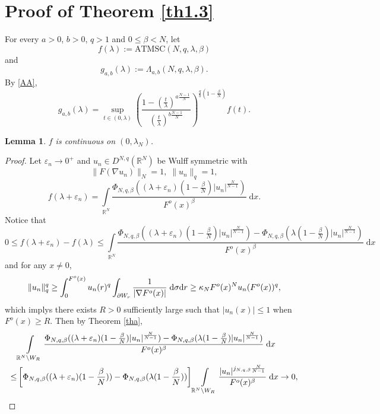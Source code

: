 \documentclass[11pt]{article}
\theoremstyle{plain}
\newtheorem{lemma}[theorem]{Lemma}
\numberwithin{equation}{section}
\newcommand{\R}{\mathbb{R}}
\begin{document}
\section{Proof of Theorem \ref{th1.3}}\label{section4}

For every $a>0$, $b>0$, $q>1$ and $0\leq\beta<N$, let
$$
f(\lambda):=\mathrm{ATMSC}(N,q,\lambda,\beta)
$$
and
$$
g_{a,b}(\lambda):=\Lambda_{a,b}(N,q,\lambda,\beta).
$$
By \eqref{AA},
$$
g_{a,b}(\lambda)=\sup\limits_{t\in(0,\lambda)}\left(\frac{1-(\frac{t}{\lambda})^{a\frac{N-1}{N}}}{(\frac{t}{\lambda})^{b\frac{N-1}{N}}}\right)^{\frac{q}{b}(1-\frac{\beta}{N})}f(t).
$$

\begin{lemma}\label{le4.1}
$f$ is continuous on $(0,\lambda_{N})$.
\end{lemma}
\begin{proof}
Let $\varepsilon_{n}\rightarrow0^{+}$ and $u_{n}\in D^{N,q}(\R^{N})$ be Wulff symmetric with
$$
\|F(\nabla u_{n})\|_{N}=1,\;\|u_{n}\|_{q}=1,
$$
$$
f(\lambda+\varepsilon_{n})=\int\limits_{\R^{N}}\frac{\Phi_{N,q,\beta}((\lambda+\varepsilon_{n})(1-\frac{\beta}{N})\lvert u_{n}\rvert^{\frac{N}{N-1}})}{F^{o}(x)^{\beta}}\;\mathrm{d}x.
$$
Notice that
$$
0\leq f(\lambda+\varepsilon_{n})-f(\lambda)\leq\int\limits_{\R^{N}}\frac{\Phi_{N,q,\beta}((\lambda+\varepsilon_{n})(1-\frac{\beta}{N})\lvert u_{n}\rvert^{\frac{N}{N-1}})-\Phi_{N,q,\beta}(\lambda(1-\frac{\beta}{N})\lvert u_{n}\rvert^{\frac{N}{N-1}})}{F^{o}(x)^{\beta}}\;\mathrm{d}x
$$
and for any $x\not=0$,
\begin{align}
    \|u_{n}\|_{q}^{q}\geq\int_{0}^{F^{o}(x)}u_{n}(r)^{q}\int_{\partial W_{r}}\frac{1}{\lvert\nabla F^{o}(x)\rvert}\;\mathrm{d}\sigma\mathrm{d}r\geq\kappa_{N}F^{o}(x)^{N}u_{n}(F^{o}(x))^{q},\notag
\end{align}
which implys there exists $R>0$ sufficiently large such that $\lvert u_{n}(x)\rvert\leq1$ when $F^{o}(x)\geq R$. Then by Theorem \ref{tha},
\begin{align}
    &\int\limits_{\R^{N}\backslash W_{R}}\frac{\Phi_{N,q,\beta}((\lambda+\varepsilon_{n})(1-\frac{\beta}{N})\lvert u_{n}\rvert^{\frac{N}{N-1}})-\Phi_{N,q,\beta}(\lambda(1-\frac{\beta}{N})\lvert u_{n}\rvert^{\frac{N}{N-1}})}{F^{o}(x)^{\beta}}\;\mathrm{d}x\notag\\
    \leq&\left[\Phi_{N,q,\beta}((\lambda+\varepsilon_{n})(1-\frac{\beta}{N}))-\Phi_{N,q,\beta}(\lambda(1-\frac{\beta}{N}))\right]\int\limits_{\R^{N}\backslash W_{R}}\frac{\lvert u_{n}\rvert^{j_{N,q,\beta}\frac{N}{N-1}}}{F^{o}(x)^{\beta}}\;\mathrm{d}x\rightarrow0,\notag

\end{align}
\end{proof}
\end{document}
